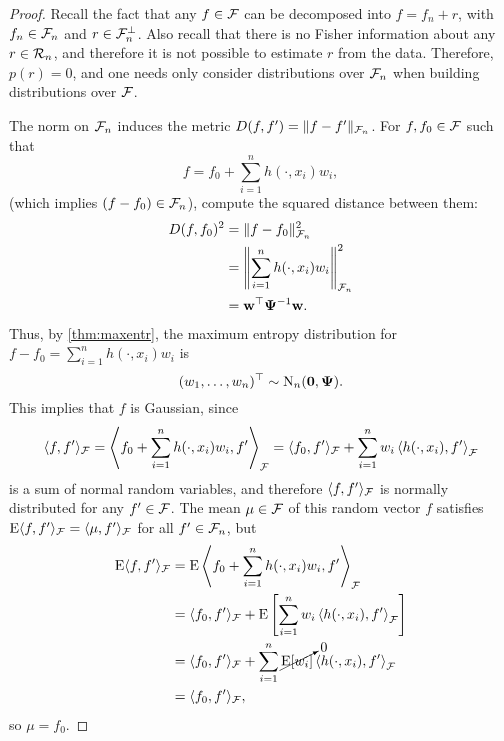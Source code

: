 \begin{proof}
  Recall the fact that any $f \in {\mathcal F}$ can be decomposed into $f = f_n + r$, with $f_n \in {\mathcal F}_n$ and $r \in {\mathcal F}_n^\bot$.
  Also recall that there is no Fisher information about any $r \in {\mathcal R}_n$, and therefore it is not possible to estimate $r$ from the data.
  Therefore, $p(r) = 0$, and one needs only consider distributions over ${\mathcal F}_n$ when building distributions over ${\mathcal F}$.
  
  The norm on ${\mathcal F}_n$ induces the metric $D(f,f') = \lVert f - f'\rVert_{{\mathcal F}_n}$.
  For $f,f_0 \in {\mathcal F}$ such that 
  \[
    f = f_0 + \sum_{i=1}^n h(\cdot,x_i)w_i,
  \]
  (which implies $(f - f_0) \in {\mathcal F}_n$), compute the squared distance between them:
  \begin{align*}
    D(f,f_0)^2 
    &= \lVert f - f_0\rVert_{{\mathcal F}_n}^2 \\
    &= \left\Vert \sum_{i=1}^n h(\cdot,x_i)w_i \right\Vert_{{\mathcal F}_n}^2 \\
    &= {\mathbf w} ^\top{\bm\Psi}^{-1} {\mathbf w}.
  \end{align*}
  Thus, by \cref{thm:maxentr}, the maximum entropy distribution for $f - f_0 = \sum_{i=1}^n h(\cdot,x_i)w_i$ is
  \[
    (w_1,\dots,w_n)^\top \sim \operatorname{N}_n({\mathbf 0},{\bm\Psi}).
  \]
  This implies that $f$ is Gaussian, since
  \begin{align*}
    \langle f,f' \rangle_{{\mathcal F}}
    = \left\langle f_0 + \sum_{i=1}^n h(\cdot,x_i)w_i, f' \right\rangle_{{\mathcal F}} 
    = \langle f_0,f'\rangle_{\mathcal F} +  \sum_{i=1}^n w_i \left\langle  h(\cdot,x_i), f' \right\rangle_{{\mathcal F}}  
  \end{align*}
  is a sum of normal random variables, and therefore $\langle f,f' \rangle_{{\mathcal F}}$ is normally distributed for any $f' \in {\mathcal F}$.
  The mean $\mu\in{\mathcal F}$ of this random vector $f$ satisfies $\operatorname{E}\langle f,f'\rangle_{{\mathcal F}}  = \langle\mu,f'\rangle_{{\mathcal F}}$ for all $f'\in{\mathcal F}_n$, but
  \vspace{-1.1em}
  \begin{align*}
    \operatorname{E}\langle f,f'\rangle_{{\mathcal F}}  
    &= \operatorname{E} \left\langle f_0 + \sum_{i=1}^n h(\cdot,x_i)w_i, f' \right\rangle_{{\mathcal F}} \\
    &= \langle f_0,f' \rangle_{{\mathcal F}} + 
    \operatorname{E} \left[ \sum_{i=1}^n w_i \left\langle  h(\cdot,x_i), f' \right\rangle_{{\mathcal F}} \right] \\
    &= \langle f_0,f' \rangle_{{\mathcal F}} + 
     \sum_{i=1}^n \cancelto{0}{\operatorname{E} [w_i]} \left\langle  h(\cdot,x_i), f' \right\rangle_{{\mathcal F}} \\
    &= \langle f_0,f' \rangle_{{\mathcal F}},
  \end{align*}
  so $\mu = f_0$. 
  

\end{proof}
